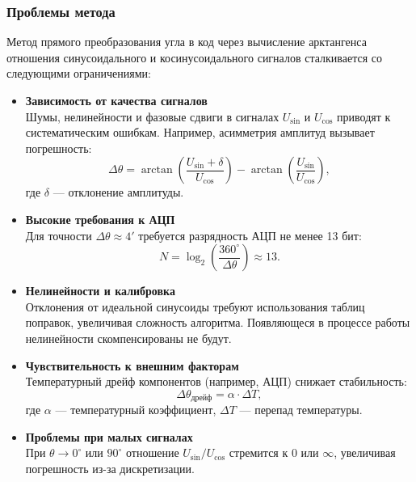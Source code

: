 \subsubsection{Проблемы метода}
Метод прямого преобразования угла в код через вычисление арктангенса отношения синусоидального и косинусоидального сигналов сталкивается со следующими ограничениями:
\begin{itemize}
    \item \textbf{Зависимость от качества сигналов} \\
    Шумы, нелинейности и фазовые сдвиги в сигналах \( U_{\sin} \) и \( U_{\cos} \) приводят к систематическим ошибкам. Например, асимметрия амплитуд вызывает погрешность:
    \begin{equation}
    \Delta\theta = \arctan\left(\frac{U_{\sin} + \delta}{U_{\cos}}\right) - \arctan\left(\frac{U_{\sin}}{U_{\cos}}\right),
    \end{equation}
    где \(\delta\) — отклонение амплитуды.

    \item \textbf{Высокие требования к АЦП} \\
    Для точности \(\Delta\theta \approx 4'\) требуется разрядность АЦП не менее 13 бит:
    \begin{equation}
    N = \log_2\left(\frac{360^\circ}{\Delta\theta}\right) \approx 13.
    \end{equation}

    \item \textbf{Нелинейности и калибровка} \\
    Отклонения от идеальной синусоиды требуют использования таблиц поправок, увеличивая сложность алгоритма. 
    Появляющеся в процессе работы нелинейности скомпенсированы не будут.

    \item \textbf{Чувствительность к внешним факторам} \\
    Температурный дрейф компонентов (например, АЦП) снижает стабильность:
    \begin{equation}
    \Delta\theta_{\text{дрейф}} = \alpha \cdot \Delta T,
    \end{equation}
    где \(\alpha\) — температурный коэффициент, \(\Delta T\) — перепад температуры.

    \item \textbf{Проблемы при малых сигналах} \\
    При \(\theta \to 0^\circ\) или \(90^\circ\) отношение \( U_{\sin}/U_{\cos} \) стремится к \(0\) или \(\infty\), увеличивая погрешность из-за дискретизации.
\end{itemize}


